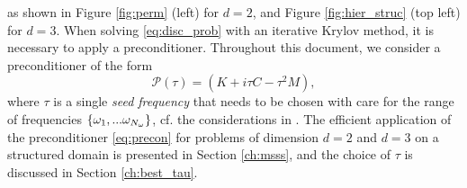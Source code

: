 as shown in Figure \ref{fig:perm} (left) for $d=2$, and Figure \ref{fig:hier_struc} (top left) for $d=3$. When solving \eqref{eq:disc_prob} with an iterative Krylov method, it is necessary to apply a preconditioner. Throughout this document, we consider a preconditioner of the form
\begin{equation}
 \label{eq:precon}
 \mathcal{P}(\tau) = (K + i \tau C - \tau^2M),
\end{equation}
where $\tau$ is a single \textit{seed frequency} that needs to be chosen with care for the range of frequencies $\{ \omega_1,...\omega_{N_{\omega}}\}$, cf. the considerations in \cite{BG15,SBK13}. The efficient application of the preconditioner \eqref{eq:precon} for problems of dimension $d=2$ and $d=3$ on a structured domain is presented in Section \ref{ch:msss}, and the choice of $\tau$ is discussed in Section \ref{ch:best_tau}.

